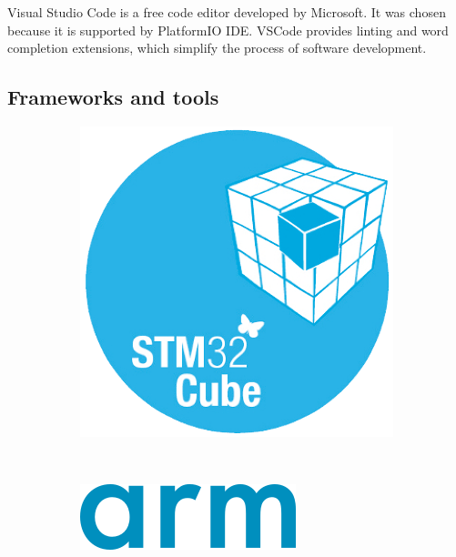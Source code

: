 \documentclass[a4paper,twoside,12pt]{book}
\begin{document}
Visual Studio Code is a free code editor developed by Microsoft.
It was chosen because it is supported by PlatformIO IDE.
VSCode provides linting and word completion extensions,
which simplify the process of software development.

\subsection{Frameworks and tools}

\begin{figure}[H]
    \centering
    \begin{subfigure}[h]{0.3\textwidth}
        \includegraphics[width=\textwidth]{images/cube_logo}
        \label{fig:cube}
    \end{subfigure}
    ~
    \begin{subfigure}[h]{0.3\textwidth}
        \includegraphics[width=\textwidth]{images/arm_logo}
        \label{fig:arm}

\end{subfigure}
\end{figure}
\end{document}
